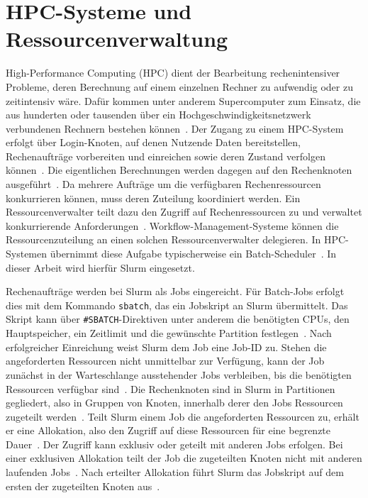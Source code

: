 \section{HPC-Systeme und Ressourcenverwaltung}
\label{sec:basics:hpc}
High-Performance Computing (HPC) dient der Bearbeitung
rechenintensiver Probleme, deren Berechnung auf einem einzelnen
Rechner zu aufwendig oder zu zeitintensiv wäre. Dafür kommen unter anderem Supercomputer zum Einsatz, die aus hunderten oder tausenden über ein
Hochgeschwindigkeitsnetzwerk verbundenen Rechnern bestehen
können~\cite{zdvhpc}. Der Zugang zu einem HPC-System erfolgt über
Login-Knoten, auf denen Nutzende Daten bereitstellen,
Rechenaufträge vorbereiten und einreichen sowie deren Zustand
verfolgen können~\cite{slurmdocs-admin}. Die eigentlichen
Berechnungen werden dagegen auf den Rechenknoten
ausgeführt~\cite{slurmdocs-admin}. Da mehrere Aufträge um die
verfügbaren Rechenressourcen konkurrieren können, muss deren
Zuteilung koordiniert werden. Ein Ressourcenverwalter teilt dazu
den Zugriff auf Rechenressourcen zu und verwaltet konkurrierende
Anforderungen~\cite{slurmdocs-quickstart}.
Workflow-Management-Systeme können die Ressourcenzuteilung an einen
solchen Ressourcenverwalter delegieren. In HPC-Systemen übernimmt
diese Aufgabe typischerweise ein
Batch-Scheduler~\cite[S.~5]{suter2026terminology}. In dieser Arbeit
wird hierfür Slurm eingesetzt.

Rechenaufträge werden bei Slurm als Jobs eingereicht. Für
Batch-Jobs erfolgt dies mit dem Kommando \texttt{sbatch}, das ein
Jobskript an Slurm übermittelt. Das Skript kann über
\texttt{\#SBATCH}-Direktiven unter anderem die benötigten CPUs, den
Hauptspeicher, ein Zeitlimit und die gewünschte Partition
festlegen~\cite{slurmdocs-sbatch}. Nach erfolgreicher Einreichung
weist Slurm dem Job eine Job-ID zu. Stehen die angeforderten
Ressourcen nicht unmittelbar zur Verfügung, kann der Job zunächst
in der Warteschlange ausstehender Jobs verbleiben, bis die
benötigten Ressourcen verfügbar
sind~\cite{slurmdocs-sbatch}. Die Rechenknoten sind in Slurm in
Partitionen gegliedert, also in Gruppen von Knoten, innerhalb derer
den Jobs Ressourcen zugeteilt
werden~\cite{slurmdocs-quickstart}. Teilt Slurm einem Job die
angeforderten Ressourcen zu, erhält er eine Allokation, also den
Zugriff auf diese Ressourcen für eine begrenzte
Dauer~\cite{slurmdocs-quickstart}. Der Zugriff kann exklusiv oder
geteilt mit anderen Jobs erfolgen. Bei einer exklusiven Allokation
teilt der Job die zugeteilten Knoten nicht mit anderen laufenden
Jobs~\cite{slurmdocs-sbatch}. Nach erteilter Allokation führt Slurm
das Jobskript auf dem ersten der zugeteilten Knoten
aus~\cite{slurmdocs-sbatch}.

